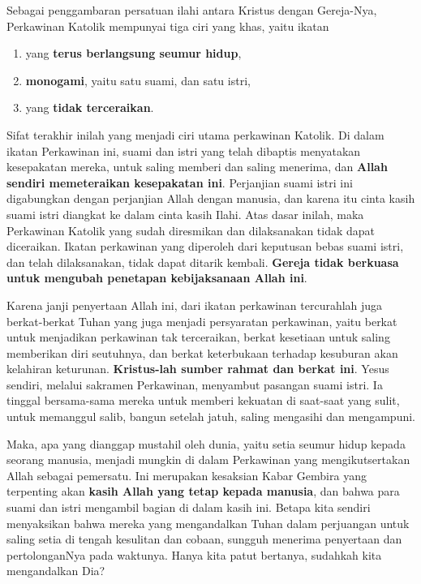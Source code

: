 
Sebagai penggambaran persatuan ilahi antara Kristus dengan Gereja-Nya, Perkawinan Katolik mempunyai tiga ciri yang khas, yaitu ikatan 
\begin{enumerate}
\item yang \textbf{terus berlangsung seumur hidup}, 
\item \textbf{monogami}, yaitu satu suami, dan satu istri, 
\item yang \textbf{tidak terceraikan}. 
\end{enumerate}
Sifat terakhir inilah yang menjadi ciri utama perkawinan Katolik. Di dalam ikatan Perkawinan ini, suami dan istri yang telah dibaptis menyatakan kesepakatan mereka, untuk saling memberi dan saling menerima, dan \textbf{Allah sendiri memeteraikan kesepakatan ini}. Perjanjian suami istri ini digabungkan dengan perjanjian Allah dengan manusia, dan karena itu cinta kasih suami istri diangkat ke dalam cinta kasih Ilahi. Atas dasar inilah, maka Perkawinan Katolik yang sudah diresmikan dan dilaksanakan tidak dapat diceraikan. Ikatan perkawinan yang diperoleh dari keputusan bebas suami istri, dan telah dilaksanakan, tidak dapat ditarik kembali. \textbf{Gereja tidak berkuasa untuk mengubah penetapan kebijaksanaan Allah ini}.

Karena janji penyertaan Allah ini, dari ikatan perkawinan tercurahlah juga berkat-berkat Tuhan yang juga menjadi persyaratan perkawinan, yaitu berkat untuk menjadikan perkawinan tak terceraikan, berkat kesetiaan untuk saling memberikan diri seutuhnya, dan berkat keterbukaan terhadap kesuburan akan kelahiran keturunan. \textbf{Kristus-lah sumber rahmat dan berkat ini}. Yesus sendiri, melalui sakramen Perkawinan, menyambut pasangan suami istri. Ia tinggal bersama-sama mereka untuk memberi kekuatan di saat-saat yang sulit, untuk memanggul salib, bangun setelah jatuh, saling mengasihi dan mengampuni.

Maka, apa yang dianggap mustahil oleh dunia, yaitu setia seumur hidup kepada seorang manusia, menjadi mungkin di dalam Perkawinan yang mengikutsertakan Allah sebagai pemersatu. Ini merupakan kesaksian Kabar Gembira yang terpenting akan \textbf{kasih Allah yang tetap kepada manusia}, dan bahwa para suami dan istri mengambil bagian di dalam kasih ini. Betapa kita sendiri menyaksikan bahwa mereka yang mengandalkan Tuhan dalam perjuangan untuk saling setia di tengah kesulitan dan cobaan, sungguh menerima penyertaan dan pertolonganNya pada waktunya. Hanya kita patut bertanya, sudahkah kita mengandalkan Dia?